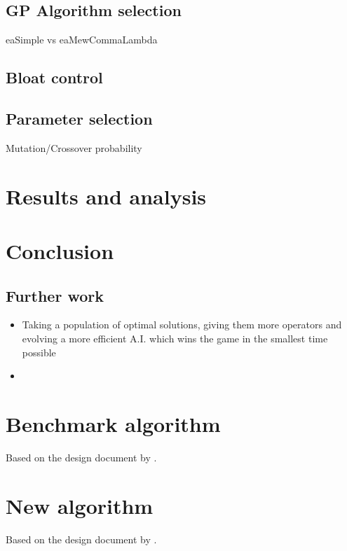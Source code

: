 \documentclass[british,10pt,a4paper]{article}
\begin{document}
\subsection{GP Algorithm selection}
eaSimple vs eaMewCommaLambda
\subsection{Bloat control}
\subsection{Parameter selection}
Mutation/Crossover probability
\section{Results and analysis}
\section{Conclusion}
\subsection{Further work}
\begin{itemize}
	\item Taking a population of optimal solutions, giving them more operators and evolving a more efficient A.I. which wins the game in the smallest time possible
	\item 
\end{itemize}

\clearpage



\clearpage
\begin{appendices}

	\section{Benchmark algorithm}\label{app:approach1}
	Based on the design document by \citet{Ehlis2000-sz}. \newline
	
  	\clearpage	

	\section{New algorithm}\label{app:approach4}
	Based on the design document by \citet{Ehlis2000-sz}. \newline
	
  	\clearpage	

\end{appendices}
\clearpage
\end{document}
